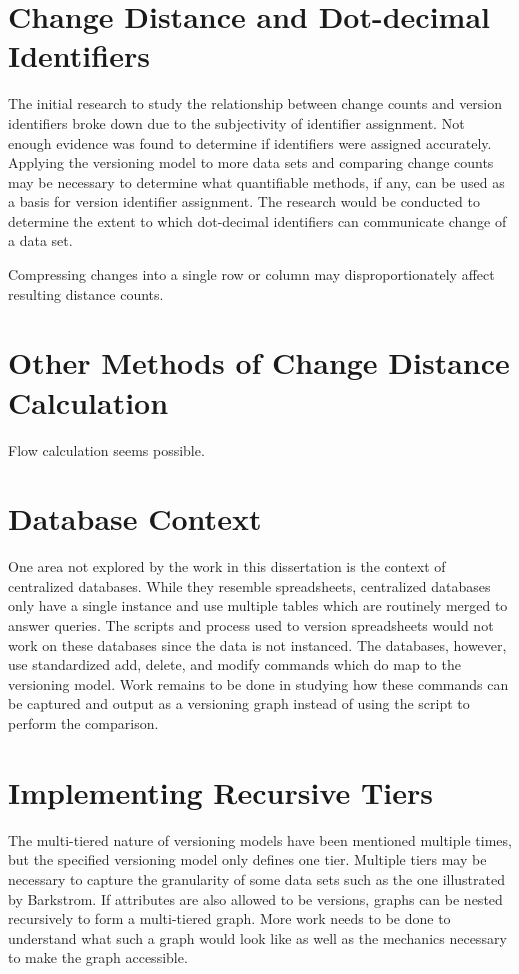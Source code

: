 \section{Change Distance and Dot-decimal Identifiers}

The initial research to study the relationship between change counts and version identifiers broke down due to the subjectivity of identifier assignment.
Not enough evidence was found to determine if identifiers were assigned accurately.
Applying the versioning model to more data sets and comparing change counts may be necessary to determine what quantifiable methods, if any, can be used as a basis for version identifier assignment.
The research would be conducted to determine the extent to which dot-decimal identifiers can communicate change of a data set.

Compressing changes into a single row or column may disproportionately affect resulting distance counts.

\section{Other Methods of Change Distance Calculation}

Flow calculation seems possible.

\section{Database Context}

One area not explored by the work in this dissertation is the context of centralized databases.
While they resemble spreadsheets, centralized databases only have a single instance and use multiple tables which are routinely merged to answer queries.
The scripts and process used to version spreadsheets would not work on these databases since the data is not instanced.
The databases, however, use standardized add, delete, and modify commands which do map to the versioning model.
Work remains to be done in studying how these commands can be captured and output as a versioning graph instead of using the script to perform the comparison.

\section{Implementing Recursive Tiers}

The multi-tiered nature of versioning models have been mentioned multiple times, but the specified versioning model only defines one tier.
Multiple tiers may be necessary to capture the granularity of some data sets such as the one illustrated by Barkstrom.
If attributes are also allowed to be versions, graphs can be nested recursively to form a multi-tiered graph.
More work needs to be done to understand what such a graph would look like as well as the mechanics necessary to make the graph accessible.

